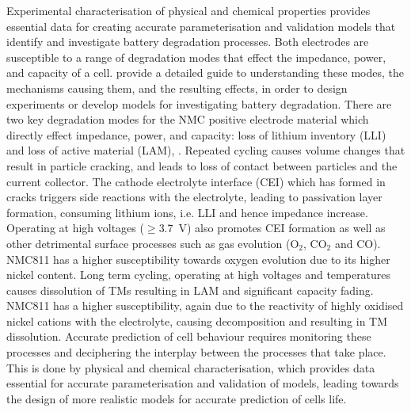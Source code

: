 \documentclass[journal=jacsat,manuscript=article]{achemso}
\begin{document}
Experimental characterisation of physical and chemical properties provides essential data for creating accurate parameterisation and validation models that identify and investigate  battery degradation processes. 
Both electrodes are susceptible to a range of degradation modes that effect the impedance, power, and capacity of a cell. 
\citeauthor{Edge2021Degradation} provide a detailed guide to understanding these modes, the mechanisms causing them, and the resulting effects, in order to design experiments or develop models for investigating battery degradation.\cite{Edge2021Degradation} 
There are two key degradation modes for the NMC positive electrode material which directly effect impedance, power, and capacity: loss of lithium inventory (LLI) and loss of active material (LAM), .\cite{erickson2017recent,erickson2017recent}
Repeated cycling causes volume changes that result in particle cracking, \cite{Woodford2010} and leads to loss of contact between particles and the current collector.\cite{erickson2017recent} 
The cathode electrolyte interface (CEI) which has formed in cracks triggers side reactions with the electrolyte, leading to passivation layer formation, consuming lithium ions, i.e. LLI and hence impedance increase.\cite{erickson2017recent}
Operating at high voltages ($\geq$3.7~V) also promotes CEI formation as well as other detrimental surface processes such as gas evolution (O$_{2}$, CO$_{2}$ and CO).\cite{jung2017chemical} 
NMC811 has a higher susceptibility towards oxygen evolution due to its higher nickel content.\cite{Phillip2020} 
Long term cycling, operating at high voltages and temperatures causes dissolution of TMs resulting in LAM and significant capacity fading. \cite{li2018temperature} 
NMC811 has a higher susceptibility, again due to the reactivity of highly oxidised nickel cations with the electrolyte, causing decomposition and resulting in TM dissolution.\cite{billy2018dissolution} 
Accurate prediction of cell behaviour requires monitoring these processes and deciphering the interplay between the processes that take place.
This is done by physical and chemical characterisation, which provides data essential for accurate parameterisation and validation of models, leading towards the design of more realistic models for accurate prediction of cells life.
\end{document}
